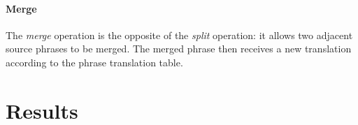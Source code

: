 \documentclass[11pt,letterpaper]{article}
\begin{document}
\paragraph{Merge} The \textit{merge} operation is the opposite of the \textit{split} operation: it allows two
adjacent source phrases to be merged. The merged phrase then receives a new translation according to the phrase
translation table.


\section{Results}




\end{document}
